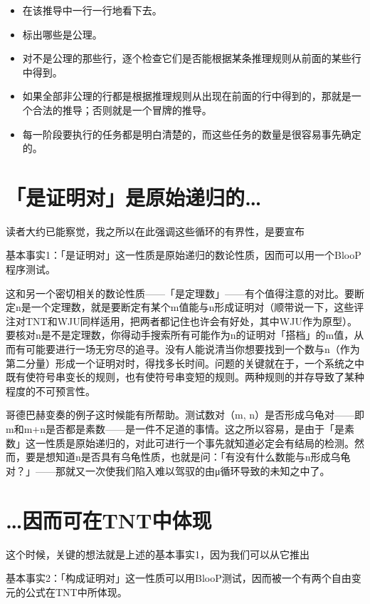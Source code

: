 \documentclass[
  12pt,
  twoside,
  openright,
  oldfontcommands,
]{memoir}
\providecommand{\tightlist}{%
  \setlength{\itemsep}{0pt}\setlength{\parskip}{0pt}}
\begin{document}
\begin{itemize}
\tightlist
\item
  在该推导中一行一行地看下去。
\item
  标出哪些是公理。
\item
  对不是公理的那些行，逐个检查它们是否能根据某条推理规则从前面的某些行中得到。
\item
  如果全部非公理的行都是根据推理规则从出现在前面的行中得到的，那就是一个合法的推导；否则就是一个冒牌的推导。
\item
  每一阶段要执行的任务都是明白清楚的，而这些任务的数量是很容易事先确定的。
\end{itemize}

\section{「是证明对」是原始递归的\ldots{}}

读者大约已能察觉，我之所以在此强调这些循环的有界性，是要宣布

{基本事实1：「是证明对」这一性质是原始递归的数论性质，因而可以用一个BlooP程序测试。}

这和另一个密切相关的数论性质------「是定理数」------有个值得注意的对比。要断定n是一个定理数，就是要断定有某个m值能与n形成证明对（顺带说一下，这些评注对TNT和WJU同样适用，把两者都记住也许会有好处，其中WJU作为原型）。要核对n是不是定理数，你得动手搜索所有可能作为n的证明对「搭档」的m值，从而有可能要进行一场无穷尽的追寻。没有人能说清当你想要找到一个数与n（作为第二分量）形成一个证明对时，得找多长时间。问题的关键就在于，一个系统之中既有使符号串变长的规则，也有使符号串变短的规则。两种规则的并存导致了某种程度的不可预言性。

哥德巴赫变奏的例子这时候能有所帮助。测试数对（m,
n）是否形成乌龟对------即m和m+n是否都是素数------是一件不足道的事情。这之所以容易，是由于「是素数」这一性质是原始递归的，对此可进行一个事先就知道必定会有结局的检测。然而，要是想知道n是否具有乌龟性质，也就是问：「有没有什么数能与n形成乌龟对？」------那就又一次使我们陷入难以驾驭的由μ循环导致的未知之中了。

\section{\ldots 因而可在TNT中体现}

这个时候，关键的想法就是上述的基本事实1，因为我们可以从它推出

{基本事实2：「构成证明对」这一性质可以用BlooP测试，因而被一个有两个自由变元的公式在TNT中所体现。}
\end{document}

